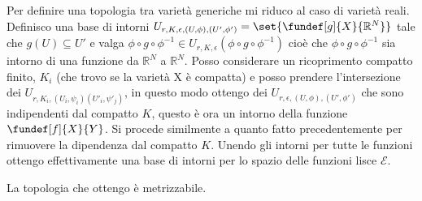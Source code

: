 \begin{defn}
Per definire una topologia tra varietà generiche mi riduco al caso di varietà reali.
Definisco una base di intorni $U_{r, K, \epsilon, (U, \phi), (U', \phi')} = \set{\fundef[g]{X}{\mathbb{R}^{N}}}$ tale che $g(U) \subseteq U'$ e valga 
$\phi \circ g \circ \phi^{-1} \in U_{r, K, \epsilon}(\phi \circ g \circ \phi^{-1})$ cioè che $\phi \circ g \circ \phi^{-1}$ sia intorno di una funzione da $\mathbb{R}^{N}$ a $\mathbb{R}^{N}$.
Posso considerare un ricoprimento compatto finito,  ${K_i}$ (che trovo se la varietà X è compatta) e posso prendere l'intersezione dei $U_{r,K_i, (U_i, \psi_i)(U'_i, \psi'_j)}$, in questo modo ottengo
dei $U_{r, \epsilon, (U, \phi), (U', \phi')}$ che sono indipendenti dal compatto $K$, questo è ora un intorno della funzione $\fundef[f]{X}{Y}$. Si procede similmente a quanto fatto precedentemente 
per rimuovere la dipendenza dal compatto $K$.
Unendo gli intorni per tutte le funzioni ottengo effettivamente una base di intorni per lo spazio delle funzioni lisce $\mathcal{E}$.

\end{defn}

\begin{oss}
 La topologia che ottengo è metrizzabile.
\end{oss}


